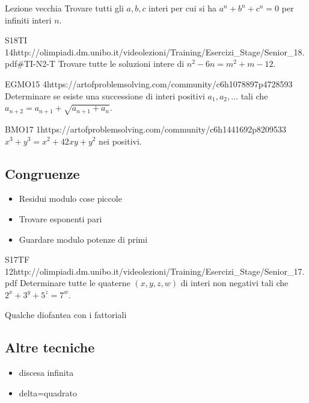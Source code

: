 \documentclass[12pt]{article}
\begin{document}
\begin{esercizio}{Lezione vecchia}{}
    Trovare tutti gli $a,b,c$ interi per cui si ha $a^n+b^n+c^n=0$ per infiniti interi $n$.
\end{esercizio}

\begin{esercizio}{S18TI 14}{http://olimpiadi.dm.unibo.it/videolezioni/Training/Esercizi_Stage/Senior_18.pdf\#TI-N2-T}
    Trovare tutte le soluzioni intere di $n^2-6n=m^2+m-12$.
\end{esercizio}

\begin{esercizio}{EGMO15 4}{https://artofproblemsolving.com/community/c6h1078897p4728593}
    Determinare se esiste una successione di interi positivi $a_1,a_2,\dots$ tali che $a_{n+2}=a_{n+1}+\sqrt{a_{n+1}+a_n}$.
\end{esercizio}

\begin{esercizio}{BMO17 1}{https://artofproblemsolving.com/community/c6h1441692p8209533}
    $x^3+y^3=x^2+42xy+y^2$ nei positivi.
\end{esercizio}


\subsection{Congruenze}
\begin{itemize}
    \item Residui modulo cose piccole
    \item Trovare esponenti pari
    \item Guardare modulo potenze di primi
\end{itemize}

\begin{esercizio}{S17TF 12}{http://olimpiadi.dm.unibo.it/videolezioni/Training/Esercizi_Stage/Senior_17.pdf}
    Determinare tutte le quaterne $(x,y,z,w)$ di interi non negativi tali che $2^x+3^y+5^z=7^w$.
\end{esercizio}

Qualche diofantea con i fattoriali

\subsection{Altre tecniche}
\begin{itemize}
    \item discesa infinita
    \item delta=quadrato
\end{itemize}
\end{document}
